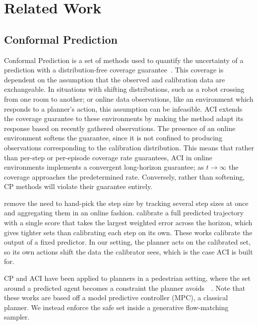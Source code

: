 \section{Related Work}

\subsection{Conformal Prediction}
\label{subsec:cp}

Conformal Prediction is a set of methods used to quantify the uncertainty of a prediction with a distribution-free coverage guarantee~\cite{stephen_gentle_2021}. This coverage is dependent on the assumption that the observed and calibration data are exchangeable. In situations with shifting distributions, such as a robot crossing from one room to another; or online data observations, like an environment which responds to a planner's action, this assumption can be infeasible. ACI extends the coverage guarantee to these environments by making the method adapt its response based on recently gathered observations. The presence of an online environment softens the guarantee, since it is not confined to producing observations corresponding to the calibration distribution. This means that rather than per-step or per-episode coverage rate guarantees, ACI in online environments implements a convergent long-horizon guarantee; as \(t \rightarrow \infty\) the coverage approaches the predetermined rate. Conversely, rather than softening, CP methods will violate their guarantee entirely. 

\citeauthor{zaffran_aci_time_series_2022} remove the need to hand-pick the step size by tracking several step sizes at once and aggregating them in an online fashion. \citeauthor{cleaveland_conformal_2024} calibrate a full predicted trajectory with a single score that takes the largest weighted error across the horizon, which gives tighter sets than calibrating each step on its own. These works calibrate the output of a fixed predictor. In our setting, the planner acts on the calibrated set, so its own actions shift the data the calibrator sees, which is the case ACI is built for.

CP and ACI have been applied to planners in a pedestrian setting, where the set around a predicted agent becomes a constraint the planner avoids~\cite{lindemann_safe_2023}~\cite{dixit_aci-planning_2023}. Note that these works are based off a model predictive controller (MPC), a classical planner. We instead enforce the safe set inside a generative flow-matching sampler.

